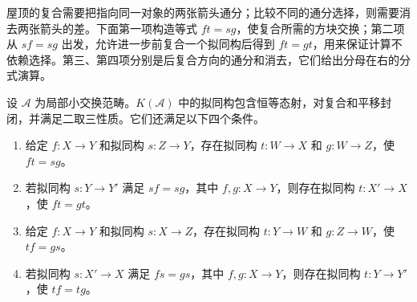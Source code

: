 屋顶的复合需要把指向同一对象的两张箭头通分；比较不同的通分选择，则需要消去两张箭头的差。下面第一项构造等式 \(ft=sg\)，使复合所需的方块交换；第二项从 \(sf=sg\) 出发，允许进一步前复合一个拟同构后得到 \(ft=gt\)，用来保证计算不依赖选择。第三、第四项分别是后复合方向的通分和消去，它们给出分母在右的分式演算。

\begin{lemma}\label{b4:lem:quasi-ore}
	设 \(\mathcal A\) 为局部小交换范畴。\(K(\mathcal A)\) 中的拟同构包含恒等态射，对复合和平移封闭，并满足二取三性质。它们还满足以下四个条件。
	\begin{enumerate}
		\item 给定 \(f:X\to Y\) 和拟同构 \(s:Z\to Y\)，存在拟同构 \(t:W\to X\) 和 \(g:W\to Z\)，使 \(ft=sg\)。
		\item 若拟同构 \(s:Y\to Y'\) 满足 \(sf=sg\)，其中 \(f,g:X\to Y\)，则存在拟同构 \(t:X'\to X\)，使 \(ft=gt\)。
		\item 给定 \(f:X\to Y\) 和拟同构 \(s:X\to Z\)，存在拟同构 \(t:Y\to W\) 和 \(g:Z\to W\)，使 \(tf=gs\)。
		\item 若拟同构 \(s:X'\to X\) 满足 \(fs=gs\)，其中 \(f,g:X\to Y\)，则存在拟同构 \(t:Y\to Y'\)，使 \(tf=tg\)。
	\end{enumerate}
\end{lemma}
